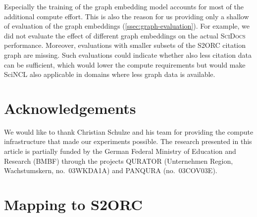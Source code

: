 \documentclass[11pt]{article}
\newcommand{\dataset}{\textsc{SciDocs}\xspace}
\newcommand{\sys}{SciNCL\xspace} \newcommand{\baselineCount}{10\xspace}
\begin{document}
Especially the training of the graph embedding model accounts for most of the additional compute effort.
This is also the reason for us providing only a shallow of evaluation of the graph embeddings (\cref{ssec:graph-evaluation}). For example, we did not evaluate the effect of different graph embeddings on the actual \dataset performance.
Moreover, evaluations with smaller subsets of the S2ORC citation graph are missing.
Such evaluations could indicate whether also less citation data can be sufficient, which would lower the compute requirements but would  make \sys also applicable in domains where less graph data is available.




\section*{Acknowledgements}

We would like to thank Christian Schulze and his team for providing the compute infrastructure that made our experiments possible.
The research presented in this article is partially funded by the German Federal Ministry of Education and Research (BMBF) through the projects QURATOR \cite{rehm2020d} (Unternehmen Region, Wachstumskern, no.~03WKDA1A) and PANQURA (no.~03COV03E).



\appendix

\clearpage


\label{sec:appendix}



    
    











    
    











\section{Mapping to S2ORC} \label{s2orc-mapping}
\end{document}
